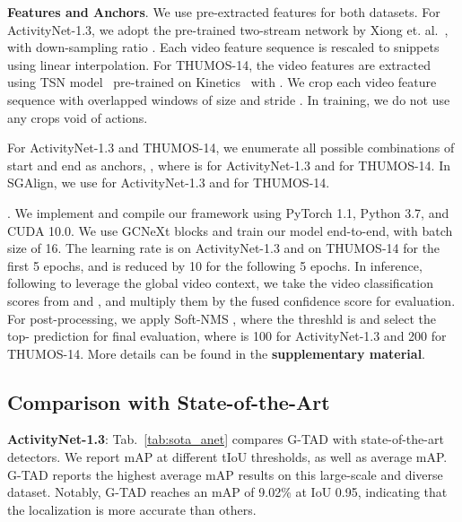 \documentclass[10pt,twocolumn,letterpaper]{article}
\begin{document}
\noindent
{\bf Features and Anchors}. We use pre-extracted features for both datasets. For ActivityNet-1.3, we adopt the pre-trained two-stream network by Xiong et. al.~\cite{xiong2016cuhk}, with down-sampling ratio . 
Each video feature sequence is rescaled to  snippets using linear interpolation.
For THUMOS-14, the video features are extracted using TSN model~\cite{TSN2016ECCV} pre-trained on Kinetics~\cite{zisserman2017kinetics}  with .
We crop each video feature sequence with overlapped windows of size  and stride . In training, we do not use any crops void of actions.


For ActivityNet-1.3 and THUMOS-14, we enumerate all possible combinations of start and end as anchors, \eg , where  is  for ActivityNet-1.3 and  for THUMOS-14. 
In SGAlign, we use  for ActivityNet-1.3 and   for THUMOS-14. 



. We implement and compile our framework using PyTorch 1.1, Python 3.7, and CUDA 10.0.
We use  
GCNeXt blocks and train our model end-to-end, with batch size of 16. 
The learning rate is  on ActivityNet-1.3 and 
 on THUMOS-14 for the first 5 epochs, and is reduced by 10 for the following 5 epochs.
In inference, following \cite{lin2018bsn}  to leverage the global video context, we take the video classification scores from \cite{wang2017untrimmed} and \cite{xiong2016cuhk}, and multiply them by the fused confidence score  for evaluation.
For post-processing, we apply Soft-NMS \cite{softNMS}, where the threshld is  and select the top- prediction for final evaluation, where  is 100 for  ActivityNet-1.3 and 200 for THUMOS-14.
More details can be found in the \textbf{supplementary material}.
 


\subsection{Comparison with State-of-the-Art}

\noindent
{\bf ActivityNet-1.3}: Tab.~\ref{tab:sota_anet} compares G-TAD with state-of-the-art detectors. We report mAP at different tIoU thresholds, as well as average mAP. G-TAD reports the highest average mAP results on this large-scale and diverse dataset. Notably, G-TAD reaches an mAP of 9.02\% at IoU 0.95, indicating that the localization is more accurate than others.
\end{document}
